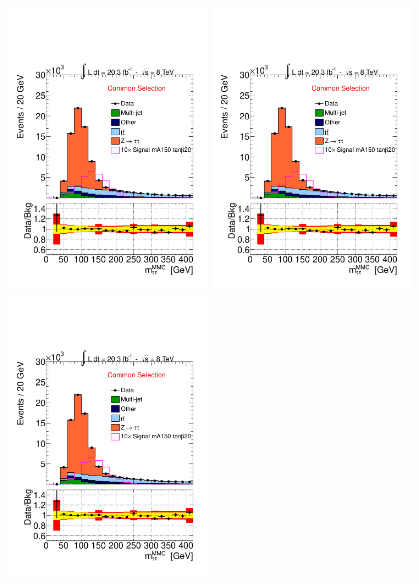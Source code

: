\begin{figure}[p]
     \begin{center}
            \includegraphics[page=9,width=0.47\textwidth]{figure/final_plots/presel_total_final.pdf}
            \includegraphics[page=10,width=0.47\textwidth]{figure/final_plots/presel_total_final.pdf}
            \includegraphics[page=8,width=0.47\textwidth]{figure/final_plots/presel_total_final.pdf}

\end{center}
\end{figure}
